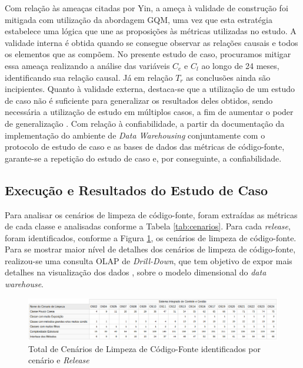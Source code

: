 Com relação às ameaças citadas por Yin, a ameça à validade de construção foi mitigada com utilização da abordagem GQM, uma vez que esta estratégia estabelece uma lógica que une as proposições às métricas utilizadas no estudo. A validade interna é obtida quando se consegue observar as relações causais e todos os elementos que as compõem. No presente estudo de caso, procuramos mitigar essa ameaça realizando a  análise das variáveis $C_e$ e $C_l$ ao longo de 24 meses, identificando sua relação causal. Já em relação $T_r$ as conclusões ainda são incipientes. Quanto à validade externa, destaca-se que a utilização de um estudo de caso não é suficiente para generalizar os resultados deles obtidos, sendo necessária a utilização de estudo em múltiplos casos, a fim de aumentar o poder de generalização \cite{yin2011applications}. Com relação à confiabilidade, a partir da documentação da implementação do ambiente de \textit{Data Warehousing} conjuntamente com o protocolo de estudo de caso e as bases de dados das métricas de código-fonte, garante-se a repetição do estudo de caso e, por conseguinte, a confiabilidade.

\subsection{Execução e Resultados do Estudo de Caso}
\label{sec:resultados}
Para analisar os cenários de limpeza de código-fonte, foram extraídas as métricas de cada classe e analisadas conforme a Tabela \ref{tab:cenarios}. Para cada \textit{release}, foram identificados, conforme a Figura \ref{fig:cenarios-release}, os cenários de limpeza de código-fonte. Para se mostrar maior nível de detalhes dos cenários de limpeza de código-fonte, realizou-se uma consulta OLAP de \textit{Drill-Down}, que tem objetivo de expor mais detalhes na visualização dos dados \cite{Kimball2002}, sobre o modelo dimensional do \textit{data warehouse}. 


\begin{figure}[ht!]
\centering
\includegraphics[keepaspectratio=true,scale=0.43]{figuras/total-cenario-tipo.eps}
\caption{Total de Cenários de Limpeza de Código-Fonte identificados por cenário e \textit{Release}}
\label{fig:cenarios-release}
\end{figure}
\FloatBarrier

